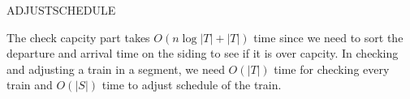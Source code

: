 \documentclass[letterpaper, 12pt, titlepage]{article}
\begin{document}
\begin{algorithm}
    \begin{algorithmic}
                    
            \EndIf
            \Else       {}
                    
                \EndIf
            \EndIf
        \EndWhile
    \end{algorithmic}
    \caption{ADJUSTSCHEDULE}
    \label{adjust}
\end{algorithm}

The check capcity part takes $O(n\log{|T|}+|T|)$ time since we need to sort the departure and arrival time on the siding to see if it is over capcity. In checking and adjusting a train in a segment, we need $O(|T|)$ time for checking every train and $O(|S|)$ time to adjust schedule of the train.
\end{document}
